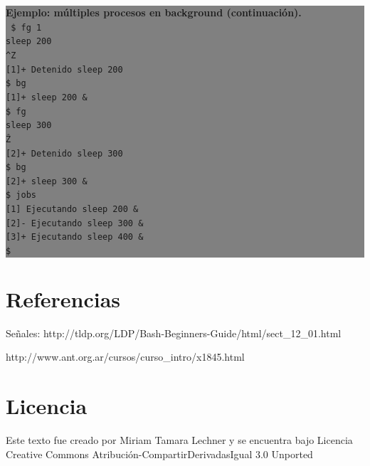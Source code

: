 \documentclass[12pt]{article}
\begin{document}
\colorbox{grey}{\parbox[t]{0.95\linewidth}{ \vspace*{0.5cm} { 
{\bf Ejemplo: múltiples procesos en background (continuación). }\\
{\tt
\$ fg 1 \\
sleep 200 \\
\texttt{\^}Z \\
{[}1{]}+  Detenido                sleep 200 \\
\$ bg \\
{[}1{]}+ sleep 200 \& \\
\$ fg \\
sleep 300 \\
\^Z\\
{[}2{]}+  Detenido                sleep 300 \\
\$ bg \\
{[}2{]}+ sleep 300 \& \\
\$ jobs\\
{[}1{]}   Ejecutando              sleep 200 \& \\
{[}2{]}-  Ejecutando              sleep 300 \& \\
{[}3{]}+  Ejecutando              sleep 400 \& \\
\$ \\
}
} \vspace*{0.5cm} } } 

\section*{Referencias}

Señales: http://tldp.org/LDP/Bash-Beginners-Guide/html/sect\_12\_01.html

http://www.ant.org.ar/cursos/curso\_intro/x1845.html

\section*{Licencia}

Este texto fue creado por Miriam Tamara Lechner y se encuentra bajo 
Licencia Creative Commons Atribución-CompartirDerivadasIgual 3.0 Unported
\end{document}
